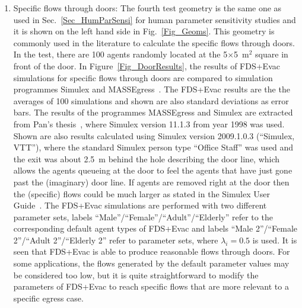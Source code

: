 \documentclass[12pt,a4paper,final,twoside]{stylevk}
\begin{document}
\begin{enumerate}
%
\item Specific flows through doors: The fourth test geometry is the
  same one as used in Sec.~\ref{Sec_HumParSensi} for human
  parameter sensitivity studies and it is shown on the left hand side
  in Fig.~\ref{Fig_Geoms}.  This geometry is commonly used in the
  literature to calculate the specific flows through doors.  In the
  test, there are 100 agents randomly located at the
  5$\times$5~$\mathrm{m^2}$ square in front of the door.  In
  Figure~\ref{Fig_DoorResults}, the results of FDS+Evac simulations
  for specific flows through doors are compared to simulation
  programmes Simulex and MASSEgress~\cite{Pan06}.  The FDS+Evac
  results are the the averages of 100 simulations and shown are also
  standard deviations as error bars. The results of the programmes
  MASSEgress and Simulex are extracted from Pan's thesis~\cite{Pan06},
  where Simulex version 11.1.3 from year 1998 was used.  Shown are
  also results calculated using Simulex version 2009.1.0.3 (``Simulex,
  VTT''), where the standard Simulex person type ``Office Staff'' was
  used and the exit was about 2.5~m behind the hole describing the
  door line, which allows the agents queueing at the door to feel the
  agents that have just gone past the (imaginary) door line.  If
  agents are removed right at the door then the (specific) flows could
  be much larger as stated in the Simulex User Guide~\cite{IES2009}.
  The FDS+Evac simulations are performed with two different parameter
  sets, labels ``Male''/``Female''/``Adult''/``Elderly'' refer to the
  corresponding default agent types of FDS+Evac and labels ``Male
  2''/``Female 2''/``Adult 2''/``Elderly 2'' refer to parameter sets,
  where $\lambda_i = 0.5$ is used.  It is seen that FDS+Evac is able
  to produce reasonable flows through doors.  For some applications,
  the flows generated by the default parameter values may be
  considered too low, but it is quite straightforward to modify the
  parameters of FDS+Evac to reach specific flows that are more
  relevant to a specific egress case.




%
\end{enumerate}
%
\end{document}

